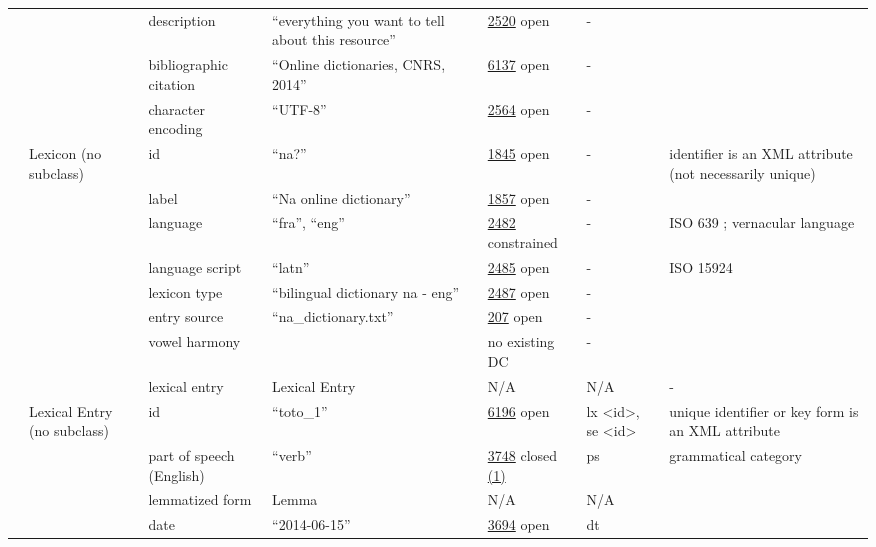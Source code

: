\documentclass[a4paper,12pt]{article}
\begin{document}
\begin{center}
\begin{longtable}{*7{p{2cm}}}
& & description & ``everything you want to tell about this resource” & \href{http://www.isocat.org/datcat/DC-2520}{2520} open & - & \\ \cmidrule{3-7}
& & bibliographic citation & ``Online dictionaries, CNRS, 2014” & \href{http://www.isocat.org/datcat/DC-6137}{6137} open & - & \\ \cmidrule{3-7}
& & character encoding & ``UTF-8” & \href{http://www.isocat.org/datcat/DC-2564}{2564} open & - & \\ \cmidrule{3-7}
& \multirow{7}{2cm}{Lexicon (no subclass)} & id & ``na?'' & \href{http://www.isocat.org/datcat/DC-1845}{1845} open & - & identifier is an XML attribute (not necessarily unique) \\ \cmidrule{3-7}
& & label & ``Na online dictionary'' & \href{http://www.isocat.org/datcat/DC-1857}{1857} open & - & \\ \cmidrule{3-7}
& & language & ``fra'', ``eng'' & \href{http://www.isocat.org/datcat/DC-2482}{2482} constrained & - & ISO 639 ; vernacular language \\ \cmidrule{3-7}
& & language script & ``latn'' & \href{http://www.isocat.org/datcat/DC-2485}{2485} open & - & ISO 15924 \\ \cmidrule{3-7}
& & lexicon type & ``bilingual dictionary na - eng'' & \href{http://www.isocat.org/datcat/DC-2487}{2487} open & - & \\ \cmidrule{3-7}
& & entry source & ``na\_dic\-tio\-na\-ry.txt'' & \href{http://www.isocat.org/datcat/DC-207}{207} open & - & \\ \cmidrule{3-7}
& & vowel harmony & & no existing DC & - & \\ \cmidrule{3-7}
& & lexical entry & Lexical Entry & N/A & N/A & - \\ \cmidrule{2-7}
& \multirow{16}{2cm}{Lexical Entry (no subclass)} & id & ``toto\_1'' & \href{http://www.isocat.org/datcat/DC-6196}{6196} open & lx \textless id\textgreater, se \textless id\textgreater & unique identifier or key form is an XML attribute \\ \cmidrule{3-7}
& & part of speech (English) & ``verb'' & \href{http://www.isocat.org/datcat/DC-3748}{3748} closed \hyperlink{1}{(1)} \hypertarget{pos}{} & ps & grammatical category \\ \cmidrule{3-7}
& & lemmatized form & Lemma & N/A & N/A & \\ \cmidrule{3-7}
& & date & ``2014-06-15'' & \href{http://www.isocat.org/datcat/DC-3694}{3694} open & dt & \\ \cmidrule{3-7}

\end{longtable}
\end{center}
\end{document}
